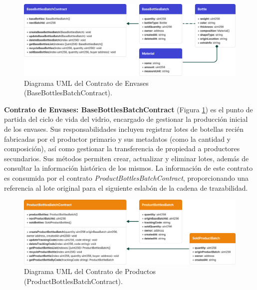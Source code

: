 \begin{figure}[!htb]
    \centering
    \includegraphics[width=\linewidth]{Figures/uml-producer-contract.png}
    \caption{Diagrama UML del Contrato de Envases (BaseBottlesBatchContract).}
    \label{fig:bottles-contract-uml}
\end{figure}

\textbf{Contrato de Envases: BaseBottlesBatchContract} (Figura \ref{fig:bottles-contract-uml})
 es el punto de partida del ciclo de vida del vidrio, encargado de gestionar la producción inicial de los envases. Sus responsabilidades incluyen registrar lotes de botellas recién fabricadas por el productor primario y sus metadatos (como la cantidad y composición), así como gestionar la transferencia de propiedad a productores secundarios. Sus métodos permiten crear, actualizar y eliminar lotes, además de consultar la información histórica de los mismos. La información de este contrato es consumida por el  contrato \textit{ProductBottlesBatchContract}, proporcionando una referencia al lote original para el siguiente eslabón de la cadena de trazabilidad.

\begin{figure}[!htb]
    \centering
    \includegraphics[width=\linewidth]{Figures/uml-product-contract.png}
    \caption{Diagrama UML del Contrato de Productos (ProductBottlesBatchContract).}
    \label{fig:product-contract-uml}
\end{figure}

